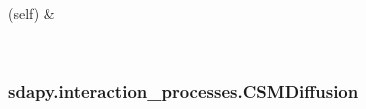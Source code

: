 \documentclass[letterpaper,10pt,english]{sphinxmanual}
\begin{document}
\begin{fulllineitems}
\begin{savenotes}
\begin{longtable}[c]{}
\begin{quote}
\begin{description}
\end{description}\end{quote}

\\
\hline
{}(self)
&

\\
\hline
\end{longtable}\sphinxatlongtableend\end{savenotes}

\end{fulllineitems}



\subsubsection{sdapy.interaction\_processes.CSMDiffusion}
\label{\detokenize{generated/sdapy.interaction_processes.CSMDiffusion:sdapy-interaction-processes-csmdiffusion}}\label{\detokenize{generated/sdapy.interaction_processes.CSMDiffusion::doc}}
\end{document}
